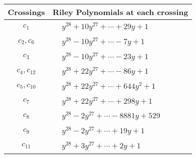 \documentclass[1p]{elsarticle_modified}
\theoremstyle{definition}
\begin{document}
\begin{tabular}{m{50pt}|m{274pt}}
Crossings & \hspace{64pt}Riley Polynomials at each crossing \\
\hline $$\begin{aligned}c_{1}\end{aligned}$$&$\begin{aligned}
&y^{28}+10 y^{27}+\cdots+29 y+1
\end{aligned}$\\
\hline $$\begin{aligned}c_{2},c_{6}\end{aligned}$$&$\begin{aligned}
&y^{28}-10 y^{27}+\cdots-7 y+1
\end{aligned}$\\
\hline $$\begin{aligned}c_{3}\end{aligned}$$&$\begin{aligned}
&y^{28}-10 y^{27}+\cdots-23 y+1
\end{aligned}$\\
\hline $$\begin{aligned}c_{4},c_{12}\end{aligned}$$&$\begin{aligned}
&y^{28}+22 y^{27}+\cdots-86 y+1
\end{aligned}$\\
\hline $$\begin{aligned}c_{5},c_{10}\end{aligned}$$&$\begin{aligned}
&y^{28}+22 y^{27}+\cdots+644 y^2+1
\end{aligned}$\\
\hline $$\begin{aligned}c_{7}\end{aligned}$$&$\begin{aligned}
&y^{28}+22 y^{27}+\cdots+298 y+1
\end{aligned}$\\
\hline $$\begin{aligned}c_{8}\end{aligned}$$&$\begin{aligned}
&y^{28}-2 y^{27}+\cdots-8881 y+529
\end{aligned}$\\
\hline $$\begin{aligned}c_{9}\end{aligned}$$&$\begin{aligned}
&y^{28}-2 y^{27}+\cdots+19 y+1
\end{aligned}$\\
\hline $$\begin{aligned}c_{11}\end{aligned}$$&$\begin{aligned}
&y^{28}+3 y^{27}+\cdots+2 y+1
\end{aligned}$\\
\hline
\end{tabular}\\~\\
\end{document}
